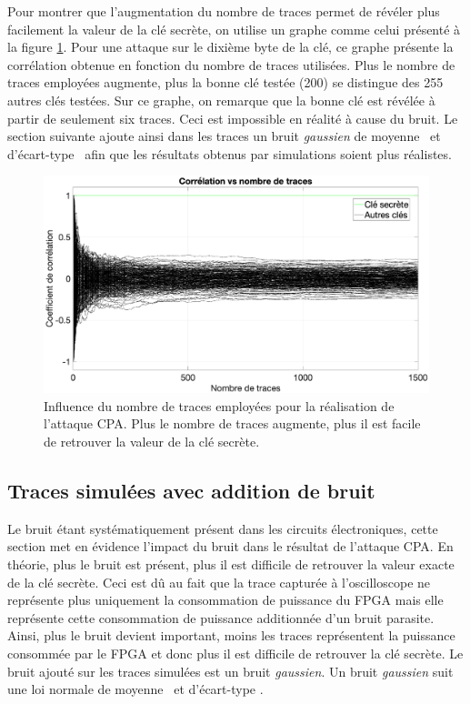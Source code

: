 \documentclass[oneside]{book}
\begin{document}
Pour montrer que l’augmentation du nombre de traces permet de révéler plus facilement la valeur de la clé secrète, on utilise un graphe comme celui présenté à la figure \ref{fig:sim_corr_fonction_nb_traces}. Pour une attaque sur le dixième byte de la clé, ce graphe présente la corrélation obtenue en fonction du nombre de traces utilisées. Plus le nombre de traces employées augmente, plus la bonne clé testée (200) se distingue des 255 autres clés testées. Sur ce graphe, on remarque que la bonne clé est révélée à partir de seulement six traces. Ceci est impossible en réalité à cause du bruit. Le section suivante ajoute ainsi dans les traces un bruit \textit{gaussien} de moyenne \mu \ et d'écart-type \sigma \ afin que les résultats obtenus par simulations soient plus réalistes.

\begin{figure}[htbp]
    \hspace{-2.5cm}
    \includegraphics[scale=0.41]{image/sim_corr_fonction_nb_traces}
    \caption{Influence du nombre de traces employées pour la réalisation de l'attaque CPA. Plus le nombre de traces augmente, plus il est facile de retrouver la valeur de la clé secrète.}
    \label{fig:sim_corr_fonction_nb_traces} 
\end{figure}

\subsection{Traces simulées avec addition de bruit}
\label{sec:sim_trace_noise}

Le bruit étant systématiquement présent dans les circuits électroniques, cette section met en évidence l'impact du bruit dans le résultat de l'attaque CPA. En théorie, plus le bruit est présent, plus il est difficile de retrouver la valeur exacte de la clé secrète. Ceci est dû au fait que la trace capturée à l'oscilloscope ne représente plus uniquement la consommation de puissance du FPGA mais elle représente cette consommation de puissance additionnée d'un bruit parasite. Ainsi, plus le bruit devient important, moins les traces représentent la puissance consommée par le FPGA et donc plus il est difficile de retrouver la clé secrète. Le bruit ajouté sur les traces simulées est un bruit \textit{gaussien}. Un bruit \textit{gaussien} suit une loi normale de moyenne \mu \ et d'écart-type \sigma.
\end{document}
